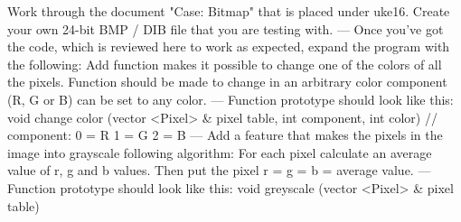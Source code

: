 Work through the document "Case: Bitmap" that is placed under uke16. 
Create your own 24-bit BMP / DIB file that you are testing with.
---
Once you've got the code, which is reviewed here to work as expected, expand the program with the following:
Add function makes it possible to change one of the colors of all the pixels. 
Function should be made to change in an arbitrary color component (R, G or B) can be set to any color. 
---
Function prototype should look like this:
	void change color (vector <Pixel> \& pixel table, int component, int color) // component: 0 = R 1 = G 2 = B
---
Add a feature that makes the pixels in the image into grayscale following algorithm: 
For each pixel calculate an average value of r, g and b values. Then put the pixel r = g = b = average value. 
---
Function prototype should look like this:
	void greyscale (vector <Pixel> \& pixel table)

